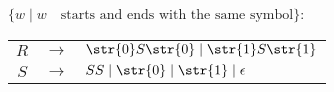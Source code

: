 $\{w \mid w \quad \text{starts and ends with the same symbol} \}$: \par
\begin{tabular}{ccl}
	$R$ & $\rightarrow$ & $\str{0}S\str{0} \mid \str{1}S\str{1}$ \\
	$S$ & $\rightarrow$ & $SS \mid \str{0} \mid \str{1} \mid \epsilon$ \\
\end{tabular}
